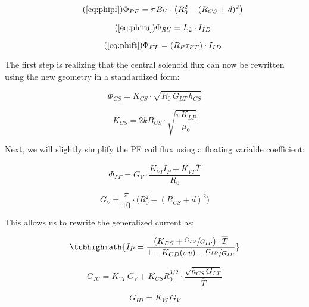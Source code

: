 \begin{equation}
	\tag{\ref{eq:phipf}}
	\Phi_{PF} = \pi B_V \cdot \left( R_0^2 - ( R_{CS} + d ) ^ 2 \right)
\end{equation}

\begin{equation}
	\tag{\ref{eq:phiru}}
	\Phi_{RU} = L_2 \cdot I_{ID}
\end{equation}

\begin{equation}
	\tag{\ref{eq:phift}}
	\Phi_{FT} = ( R_P \tau_{FT} ) \cdot I_{ID}
\end{equation}

The first step is realizing that the central solenoid flux can now be rewritten using the new geometry in a standardized form:

\begin{equation}
	\Phi_{CS} = K_{CS} \cdot \sqrt{ R_0 \, G_{LT} \, h_{CS} }
\end{equation}

\begin{equation}
	K_{CS} = 2 k B_{CS} \cdot \sqrt{ \frac{ \pi K_{LP} }{ \mu_0 } }
\end{equation}

Next, we will slightly simplify the PF coil flux using a floating variable coefficient:

\begin{equation}
	\Phi_{PF} = G_V \cdot \frac{ K_{VI} I_P + K_{VT} \overline T }{R_0}
\end{equation}

\begin{equation}
	G_V = \frac{ \pi }{ 10 } \cdot \big( R_0^2 - \left( R_{CS} + d \right) ^2 \big)
\end{equation}

This allows us to rewrite the generalized current as:

\begin{equation}
	\label{eq:gen_ip}
	\tcbhighmath{
	I_P = \frac{ \left( K_{BS} + \sfrac{ G_{IU} }{ G_{IP} } \right) \cdot \overline T }{ 1 - K_{CD} ( \sigma v ) - \sfrac{ G_{ID} }{ G_{IP} } }
	}
\end{equation}

\begin{equation}
	G_{IU} = K_{VT} \, G_V + K_{CS} R_0^{3/2} \cdot \frac{ \sqrt{ h_{CS} \, G_{LT} } }{ \overline T }
\end{equation}

\begin{equation}
	G_{ID} = K_{VI} \, G_V
\end{equation}

